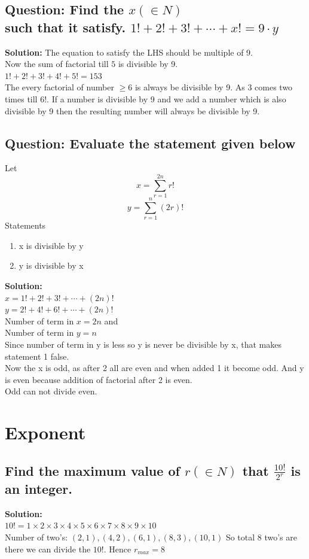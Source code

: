\subsection*{Question: Find the $x(\in N)$\\ such that it satisfy. $1!+2!+3!+\cdots+x!= 9\cdot y$}
\textbf{Solution: }
The equation to satisfy the LHS should be multiple of 9.\\
Now the sum of factorial till $5$ is divisible by 9. \\
$1!+2!+3!+4!+5! = 153$\\
The every factorial of number $\geq 6$ is always be divisible by 9. As 3 comes two times till $6!$. If a number is divisible by 9 and we add a number which is also divisible by 9 then the resulting number will always be divisible by 9.
\newpage
\subsection*{Question: Evaluate the statement given below}
Let \[
x = \sum_{r=1}^{2n}r!
\]
\[
y = \sum_{r=1}^{n}(2r)! 
\]
Statements
\begin{enumerate}[label = (\alph*)]
    \item x is divisible by y
    \item y is divisible by x
\end{enumerate}
\textbf{Solution: }\\
$x = 1!+2!+3!+\cdots+(2n)!$ \\
$y = 2!+4!+6!+\cdots+(2n)!$ \\
Number of term in $x = 2n$ and\\
Number of term in $y = n$\\
Since number of term in y is less so y is never be divisible by x, that makes statement 1 false.\\
Now the x is odd, as after 2 all are even and when added 1 it become odd. And y is even because addition of factorial after 2 is even.\\
Odd can not divide even.
\newpage
\section*{Exponent}
\subsection*{Find the maximum value of $r(\in N)$ that $\frac{10!}{2^r}$ is an integer.}
\textbf{Solution: } \\
$10! = 1 \times2 \times3 \times4 \times5 \times6 \times7 \times8 \times9 \times10$\\
Number of two's: 
$(2, 1), (4,2), (6, 1), (8, 3), (10, 1  )$
So total 8 two's are there we can divide the $10!$. Hence $r_{max} = 8$


